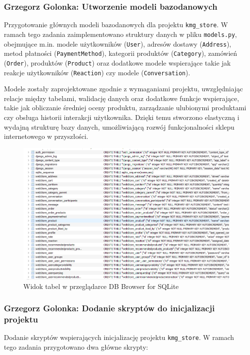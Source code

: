 \documentclass[12pt,a4paper,oneside]{article}
\theoremstyle{definition}
\numberwithin{equation}{section}
\begin{document}
\subsubsection{Grzegorz Golonka: Utworzenie modeli bazodanowych}
\label{section:1.3.20}
Przygotowanie głównych modeli bazodanowych dla projektu \texttt{kmg\_store}.
W ramach tego zadania zaimplementowano struktury danych w pliku \texttt{models.py},
obejmujące m.in. modele użytkowników (\texttt{User}), adresów dostawy (\texttt{Address}),
metod płatności (\texttt{PaymentMethod}), kategorii produktów (\texttt{Category}),
zamówień (\texttt{Order}), produktów (\texttt{Product}) oraz dodatkowe modele wspierające
takie jak reakcje użytkowników (\texttt{Reaction}) czy modele (\texttt{Conversation}).

Modele zostały zaprojektowane zgodnie z wymaganiami projektu, uwzględniając relacje między tabelami,
walidację danych oraz dodatkowe funkcje wspierające, takie jak obliczanie średniej oceny produktu,
zarządzanie ulubionymi produktami czy obsługa historii interakcji użytkownika.
Dzięki temu stworzono elastyczną i wydajną strukturę bazy danych,
umożliwiającą rozwój funkcjonalności sklepu internetowego w przyszłości.

\begin{figure}[H]
    \centering
    \includegraphics[width=0.9\columnwidth]{images/krzysztofBImages/modele_bazodanowe.png}
    \caption{Widok tabel w przeglądarce DB Browser for SQLite}
    \label{fig:db_models}
\end{figure}


%
%
\subsubsection{Grzegorz Golonka: Dodanie skryptów do inicjalizacji projektu}
\label{section:1.3.21}
Dodanie skryptów wspierających inicjalizację projektu \texttt{kmg\_store}. W ramach tego zadania przygotowano dwa główne skrypty:
\end{document}
